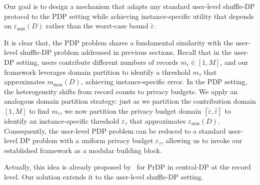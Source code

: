 Our goal is to design a mechanism that adapts any standard user-level shuffle-DP protocol to the PDP setting while achieving instance-specific utility that depends on $\varepsilon_{\min}(D)$ rather than the worst-case bound $\check{\varepsilon}$.




It is clear that, the PDP problem shares a fundamental similarity with the user-level shuffle-DP problem addressed in previous sections. 
Recall that in the user-DP setting, users contribute different numbers of records $m_i \in [1, M]$, and our framework leverages domain partition to identify a threshold $m_\tau$ that approximates $m_{\max}(D)$, achieving instance-specific error. 
In the PDP setting, the heterogeneity shifts from record counts to privacy budgets. 
We apply an analogous domain partition strategy: just as we partition the contribution domain $[1, M]$ to find $m_\tau$, we now partition the privacy budget domain $[\check{\varepsilon}, \hat{\varepsilon}]$ to identify an instance-specific threshold $\varepsilon_\tau$ that approximates $\varepsilon_{\min}(D)$.
Consequently, the user-level PDP problem can be reduced to a standard user-level DP problem with a uniform privacy budget $\varepsilon_\tau$, allowing us to invoke our established framework as a modular building block.

Actually, this idea is already proposed by~\cite{chen2025general} for PrDP in central-DP at the record level. Our solution extends it to the user-level shuffle-DP setting. 





